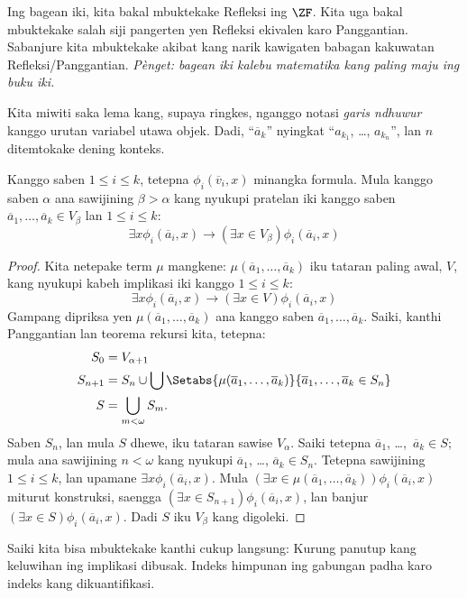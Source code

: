 \documentclass[../../../include/open-logic-section]{subfiles}
\begin{document}

Ing bagean iki, kita bakal mbuktekake Refleksi
ing $\ZF$. Kita uga bakal mbuktekake salah siji
pangerten yen Refleksi ekivalen karo Panggantian.
Sabanjure kita mbuktekake akibat kang narik
kawigaten babagan kakuwatan Refleksi/Panggantian.
\emph{Pènget: bagean iki kalebu matematika
kang paling maju ing buku iki.}

Kita miwiti saka lema kang, supaya ringkes,
nganggo notasi \emph{garis ndhuwur} kanggo
urutan variabel utawa objek. Dadi,
``$\overline{a}_k$'' nyingkat
``$a_{k_1}$, \dots, $a_{k_n}$'',
lan $n$ ditemtokake dening konteks.

\begin{lem}
Kanggo saben $1 \leq i \leq k$, tetepna
$\phi_i(\overline{v}_i, x)$ minangka formula.
Mula kanggo saben $\alpha$ ana sawijining
$\beta > \alpha$ kang nyukupi pratelan iki
kanggo saben $\overline{a}_1, \ldots,
\overline{a}_k \in V_\beta$ lan
$1 \leq i \leq k$:
\[
	\exists x\phi_i(\overline{a}_i, x) \rightarrow (\exists x \in V_\beta) \phi_i(\overline{a}_i, x)
\]
\end{lem}

\begin{proof}
Kita netepake term $\mu$ mangkene:
$\mu(\overline{a}_1, \ldots,
\overline{a}_k)$ iku tataran paling awal, $V$,
kang nyukupi kabeh implikasi iki kanggo
$1 \leq i \leq k$:
\[
\exists x\phi_i(\overline{a}_i, x) \rightarrow (\exists x \in V) \phi_i(\overline{a}_i, x)
\]
Gampang dipriksa yen
$\mu(\overline{a}_1, \ldots, \overline{a}_k)$
ana kanggo saben $\overline{a}_1, \ldots,
\overline{a}_k$. Saiki, kanthi Panggantian lan
teorema rekursi kita, tetepna:
\begin{align*}
	S_0 & = V_{\alpha+1}\\
	S_{n+1} & = S_n \cup \bigcup
	\Setabs{\mu(\overline{a}_1, \ldots, \overline{a}_k)}
	{\overline{a}_1, \ldots, \overline{a}_k \in S_n} \\
	S &= \bigcup_{m < \omega} S_m.
\end{align*}
Saben $S_n$, lan mula $S$ dhewe, iku tataran
sawise $V_\alpha$. Saiki tetepna
$\overline{a}_1$, \dots,~$\overline{a}_k \in S$;
mula ana sawijining $n < \omega$ kang nyukupi
$\overline{a}_1$, \dots,
$\overline{a}_k \in S_n$. Tetepna sawijining
$1 \leq i \leq k$, lan upamane
$\exists x \phi_i(\overline{a}_i,x)$.
Mula $(\exists x \in \mu(\overline{a}_1,
\ldots, \overline{a}_k))\phi_i(\overline{a}_i, x)$
miturut konstruksi, saengga
$(\exists x \in S_{n+1})\phi_i(\overline{a}_i, x)$,
lan banjur
$(\exists x \in S)\phi_i(\overline{a}_i, x)$.
Dadi $S$ iku $V_\beta$ kang digoleki.
\end{proof}
\noindent 
Saiki kita bisa mbuktekake
kanthi cukup langsung:
Kurung panutup kang keluwihan ing implikasi dibusak. Indeks himpunan ing gabungan padha karo indeks kang dikuantifikasi.
\end{document}
